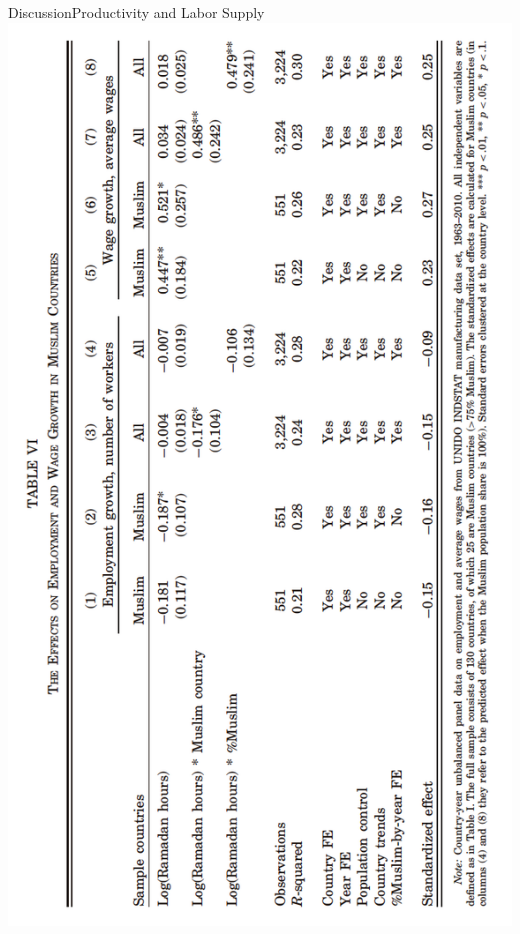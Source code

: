\documentclass[pdftex,12pt,xcolor=pdftex,table]{beamer}
\begin{document}
    \begin{frame}{Discussion}{Productivity and Labor Supply}
    \vspace{-0.5cm}
    \centering\includegraphics[scale=0.55, angle=270]{Reglabor.png}
    \end{frame}
    
\end{document}
